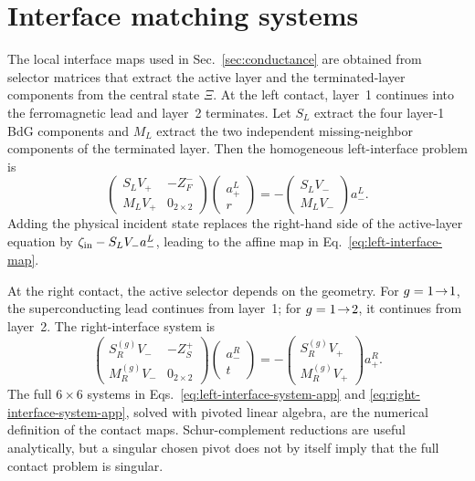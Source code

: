 \section{Interface matching systems}
\label{app:interface-matching}

The local interface maps used in Sec.~\ref{sec:conductance} are obtained from selector matrices that extract the active layer and the terminated-layer components from the central state $\Xi$.  At the left contact, layer~1 continues into the ferromagnetic lead and layer~2 terminates.  Let $S_L$ extract the four layer-1 BdG components and $M_L$ extract the two independent missing-neighbor components of the terminated layer.  Then the homogeneous left-interface problem is
\begin{equation}
    \begin{pmatrix}
        S_LV_+ & -Z_F^-\\
        M_LV_+ & 0_{2\times2}
    \end{pmatrix}
    \begin{pmatrix}
        a_+^L\\ r
    \end{pmatrix}
    =
    -
    \begin{pmatrix}
        S_LV_-\\ M_LV_-
    \end{pmatrix}a_-^L.
    \label{eq:left-interface-system-app}
\end{equation}
Adding the physical incident state replaces the right-hand side of the active-layer equation by $\zeta_{\rm in}-S_LV_-a_-^L$, leading to the affine map in Eq.~\eqref{eq:left-interface-map}.

At the right contact, the active selector depends on the geometry.  For $g=1\!\to\!1$, the superconducting lead continues from layer~1; for $g=1\!\to\!2$, it continues from layer~2.  The right-interface system is
\begin{equation}
    \begin{pmatrix}
        S_R^{(g)}V_- & -Z_S^+\\
        M_R^{(g)}V_- & 0_{2\times2}
    \end{pmatrix}
    \begin{pmatrix}
        a_-^R\\ t
    \end{pmatrix}
    =
    -
    \begin{pmatrix}
        S_R^{(g)}V_+\\ M_R^{(g)}V_+
    \end{pmatrix}a_+^R.
    \label{eq:right-interface-system-app}
\end{equation}
The full $6\times6$ systems in Eqs.~\eqref{eq:left-interface-system-app} and \eqref{eq:right-interface-system-app}, solved with pivoted linear algebra, are the numerical definition of the contact maps.  Schur-complement reductions are useful analytically, but a singular chosen pivot does not by itself imply that the full contact problem is singular.
